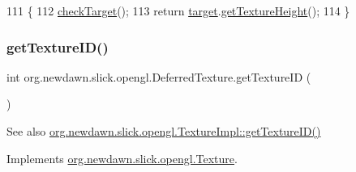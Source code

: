 \begin{DoxyCode}
111                                   \{
112         \mbox{\hyperlink{classorg_1_1newdawn_1_1slick_1_1opengl_1_1_deferred_texture_a22f14bcd9cbd4bf033e2308b90464dce}{checkTarget}}();
113         \textcolor{keywordflow}{return} \mbox{\hyperlink{classorg_1_1newdawn_1_1slick_1_1opengl_1_1_deferred_texture_aa70a4b195d0b965a0099d0e7bc18d9d2}{target}}.\mbox{\hyperlink{classorg_1_1newdawn_1_1slick_1_1opengl_1_1_texture_impl_ad3ab4017a31fb25922ee51990acb2231}{getTextureHeight}}();
114     \}
\end{DoxyCode}
\mbox{\label{classorg_1_1newdawn_1_1slick_1_1opengl_1_1_deferred_texture_a20ec239f08d67ed95ed1091d402dbf9f}} 
\subsubsection{\texorpdfstring{get\+Texture\+I\+D()}{getTextureID()}}
{\footnotesize\ttfamily int org.\+newdawn.\+slick.\+opengl.\+Deferred\+Texture.\+get\+Texture\+ID (\begin{DoxyParamCaption}{ }\end{DoxyParamCaption})\hspace{0.3cm}{\ttfamily [inline]}}

\begin{DoxySeeAlso}{See also}
\mbox{\hyperlink{classorg_1_1newdawn_1_1slick_1_1opengl_1_1_texture_impl_a5f9635744122138ab81a37fe44a8bcdc}{org.\+newdawn.\+slick.\+opengl.\+Texture\+Impl\+::get\+Texture\+I\+D()}} 
\end{DoxySeeAlso}


Implements \mbox{\hyperlink{interfaceorg_1_1newdawn_1_1slick_1_1opengl_1_1_texture_a0d846c1cfcc66768db002d4eb06ad841}{org.\+newdawn.\+slick.\+opengl.\+Texture}}.


